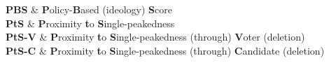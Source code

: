 \documentclass[11pt, oneside, dvipsnames]{Thesis} %
\begin{document}
\clearpage %


{
	\textbf{PBS} & \textbf{P}olicy-\textbf{B}ased (ideology) \textbf{S}core\\
	\textbf{PtS} & \textbf{P}roximity \textbf{t}o \textbf{S}ingle-peakedness\\
	\textbf{PtS-V} & \textbf{P}roximity \textbf{t}o \textbf{S}ingle-peakedness (through) \textbf{V}oter (deletion)\\
	\textbf{PtS-C} & \textbf{P}roximity \textbf{t}o \textbf{S}ingle-peakedness (through) \textbf{C}andidate (deletion)\\
}





\clearpage %

\end{document}
